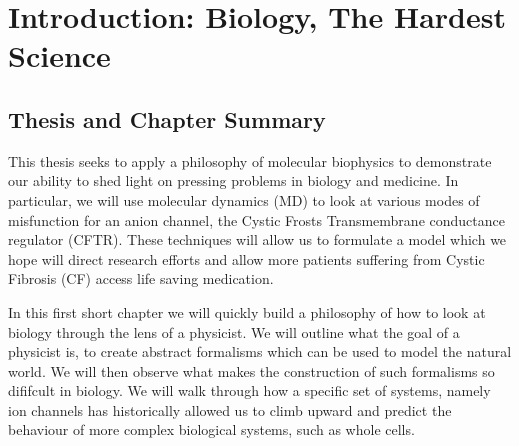 \chapter{Introduction: Biology, The Hardest Science}
\setcounter{page}{1}
\label{chap:intro}
 {}
\vspace
\section{Thesis and Chapter Summary}

This thesis seeks to apply a philosophy of molecular biophysics to demonstrate our ability to shed light on pressing problems in biology and medicine. In particular, we will use molecular dynamics (MD) to look at various modes of misfunction for an anion channel, the Cystic Frosts Transmembrane conductance regulator (CFTR).  These techniques will allow us to formulate a model which we hope will direct research efforts and allow more patients suffering from Cystic Fibrosis (CF) access life saving medication. 

In this first short chapter we will quickly build a philosophy of how to look at biology through the lens of a physicist. We will outline what the goal of a physicist is, to create abstract formalisms which can be used to model the natural world. We will then observe what makes the construction of such formalisms so dififcult in biology. We will walk through how a specific set of systems, namely ion channels has historically allowed us to climb upward and predict the behaviour of more complex biological systems, such as whole cells. 

